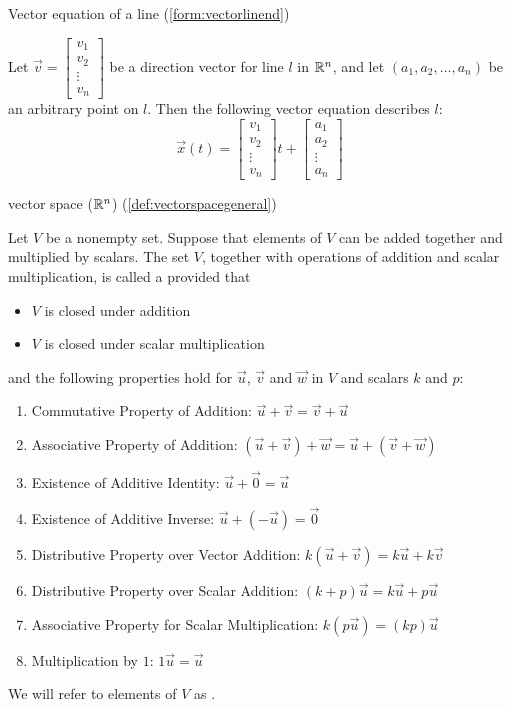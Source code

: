 \documentclass{ximera}
\begin{document}
Vector equation of a line (\ref{form:vectorlinend})
\begin{expandable}
    Let $\vec{v}=\begin{bmatrix}v_1\\v_2\\\vdots\\v_n\end{bmatrix}$ be a direction vector for line $l$ in $\mathbb{R}^n$, and let $(a_1, a_2,\ldots , a_n)$ be an arbitrary point on $l$.  Then the following vector equation describes $l$:
$$\vec{x}(t)=\begin{bmatrix}v_1\\v_2\\\vdots\\v_n\end{bmatrix}t+\begin{bmatrix}a_1\\a_2\\\vdots\\a_n\end{bmatrix}$$
\end{expandable}

vector space (\href{https://ximera.osu.edu/oerlinalg/LinearAlgebra/VSP-0020/main}{$\mathbb{R}^n$})
(\ref{def:vectorspacegeneral})
\begin{expandable}
    Let $V$ be a nonempty set.  Suppose that elements of $V$ can be added together and multiplied by scalars.  The set $V$, together with operations of addition and scalar multiplication, is called a  provided that 
  \begin{itemize}
  \item[] $V$ is closed under addition
  \item[] $V$ is closed under scalar multiplication
  \end{itemize}
  and the following properties hold for $\vec{u}$, $\vec{v}$ and $\vec{w}$ in $V$ and scalars $k$ and $p$:
  \begin{enumerate}
   \item 
  Commutative Property of Addition:\quad
  $\vec{u}+\vec{v}=\vec{v}+\vec{u}$
  \item 
  Associative Property of Addition:\quad
  $(\vec{u}+\vec{v})+\vec{w}=\vec{u}+(\vec{v}+\vec{w})$
  \item 
  Existence of Additive Identity:\quad
  $\vec{u}+\vec{0}=\vec{u}$
  \item 
  Existence of Additive Inverse:\quad
  $\vec{u}+(-\vec{u})=\vec{0}$
  \item 
  Distributive Property over Vector Addition:\quad
  $k(\vec{u}+\vec{v})=k\vec{u}+k\vec{v}$
  \item 
  Distributive Property over Scalar Addition:\quad
  $(k+p)\vec{u}=k\vec{u}+p\vec{u}$
  \item 
  Associative Property for Scalar Multiplication:\quad
  $k(p\vec{u})=(kp)\vec{u}$
  \item 
  Multiplication by $1$:\quad
  $1\vec{u}=\vec{u}$
  \end{enumerate}
We will refer to elements of $V$ as .  
\end{expandable}
\end{document}
